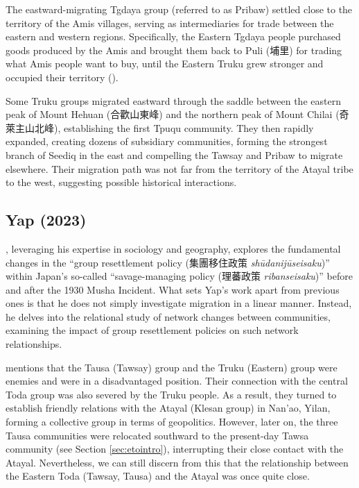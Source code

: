 The eastward-migrating Tgdaya group (referred to as Pribaw) settled close to the territory of the Amis villages, serving as intermediaries for trade between the eastern and western regions. Specifically, the Eastern Tgdaya people purchased goods produced by the Amis and brought them back to Puli (埔里) for trading what Amis people want to buy, until the Eastern Truku grew stronger and occupied their territory (\cite[70]{liao1977Sedtheruy}).

Some Truku groups migrated eastward through the saddle between the eastern peak of Mount Hehuan (合歡山東峰) and the northern peak of Mount Chilai (奇萊主山北峰), establishing the first Tpuqu community. They then rapidly expanded, creating dozens of subsidiary communities, forming the strongest branch of Seediq in the east and compelling the Tawsay and Pribaw to migrate elsewhere. Their migration path was not far from the territory of the Atayal tribe to the west, suggesting possible historical interactions.

\subsection{Yap (2023)}

\textcite{yap2023}, leveraging his expertise in sociology and geography, explores the fundamental changes in the ``group resettlement policy (集團移住政策 \textit{shūdanijūseisaku})'' within Japan's so-called ``savage-managing policy (理蕃政策 \textit{ribanseisaku})'' before and after the 1930 Musha Incident. What sets Yap's work apart from previous ones is that he does not simply investigate migration in a linear manner. Instead, he delves into the relational study of network changes between communities, examining the impact of group resettlement policies on such network relationships.

\textcite[137,153]{yap2023} mentions that the Tausa (Tawsay) group and the Truku (Eastern) group were enemies and were in a disadvantaged position. Their connection with the central Toda group was also severed by the Truku people. As a result, they turned to establish friendly relations with the Atayal (Klesan group) in Nan'ao, Yilan, forming a collective group in terms of geopolitics. However, later on, the three Tausa communities were relocated southward to the present-day Tawsa community (see Section \ref{sec:etointro}), interrupting their close contact with the Atayal. Nevertheless, we can still discern from this that the relationship between the Eastern Toda (Tawsay, Tausa) and the Atayal was once quite close.


